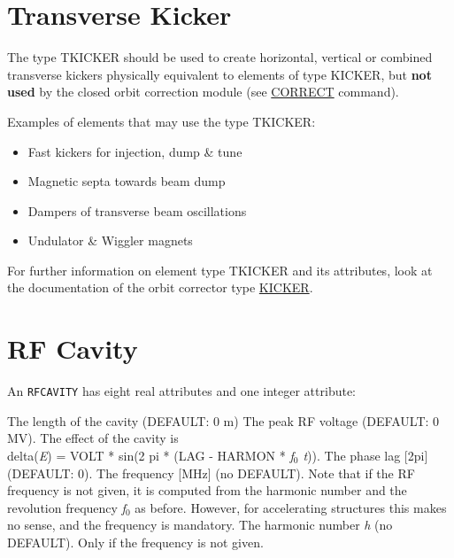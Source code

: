 \section{Transverse Kicker}
\label{sec:tkicker}

The type TKICKER should be used to create horizontal, vertical or
combined transverse kickers physically equivalent to elements of type
KICKER, but \textbf{not used} by the closed orbit correction module (see
\href{../cororbit/co_correct.html}{CORRECT} command).   

Examples of elements that may use the type TKICKER: 
\begin{itemize}
   \item Fast kickers for injection, dump \& tune
   \item Magnetic septa towards beam dump
   \item Dampers of transverse beam oscillations
   \item Undulator \& Wiggler magnets
\end{itemize}

For further information on element type TKICKER and its attributes, look
at the documentation of the orbit corrector type
\href{kickers.html#kick}{KICKER}.   


\section{RF Cavity}
\label{sec:rf_cavity}




An {\tt RFCAVITY} has eight real attributes and one integer attribute: 
\begin{madlist}
    The length of the cavity (DEFAULT: 0 m) 
    The peak RF voltage (DEFAULT: 0 MV). The effect of the cavity is \\
     delta(\textit{E}) = VOLT * sin(2 pi * (LAG - HARMON * \textit{f$_0$ t})). 
    The phase lag [2pi] (DEFAULT: 0). 
    The frequency [MHz] (no DEFAULT). Note that if the RF
     frequency is not given, it is computed from the harmonic number and
     the revolution frequency \textit{f$_0$} as before. However, for
     accelerating structures this makes no sense, and the frequency is
     mandatory.  
    The harmonic number \textit{h} (no DEFAULT). Only if
     the frequency is not given.  
\end{madlist}

